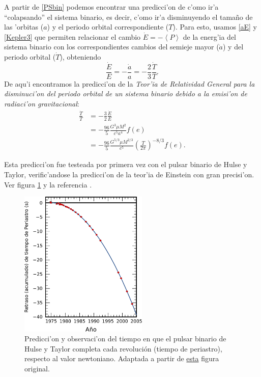 A partir de \eqref{PSbin} podemos encontrar una predicci'on de c'omo ir'a ``colapsando'' el sistema binario, es decir, c'omo ir'a disminuyendo el tama\~no de las 'orbitas ($a$) y el periodo orbital correspondiente ($T$). Para esto, usamos \eqref{aE} y \eqref{Kepler3} que permiten relacionar el cambio $\dot{E}=-\left\langle P\right\rangle$ de la energ'ia del sistema binario con los correspondientes cambios del semieje mayor ($\dot{a}$) y del periodo orbital ($\dot{T}$), obteniendo
\begin{equation}
\frac{\dot{E}}{E}=-\frac{\dot{a}}{a}=-\frac{2}{3}\frac{\dot{T}}{T}.
\end{equation}
De aqu'i encontramos la predicci'on de la \textit{Teor'ia de Relatividad General para la disminuci'on del periodo orbital de un sistema binario debido a la emisi'on de radiaci'on gravitacional}:
\begin{align}
\frac{\dot{T}}{T} &= -\frac{3}{2}\frac{\dot{E}}{E} \\
&= -\frac{96}{5} \frac{G^3\mu M^2}{c^5a^4}f(e) \\
&= -\frac{96}{5} \frac{G^{5/3}\mu M^{2/3}}{c^5}\left(\frac{T}{2\pi}\right)^{-8/3}f(e).
\end{align}

Esta predicci'on fue testeada por primera vez con el pulsar binario de Hulse y Taylor, verific'andose la predicci'on de la teor'ia de Einstein con gran precisi'on. Ver figura \ref{fig:HT} y la referencia \cite{WT05}.
\begin{center}
\begin{figure}[H]
\centerline{\includegraphics[height=7cm]{fig/fig-HT.pdf}}
\caption{Predicci'on y observaci'on del tiempo en que el pulsar binario de Hulse y Taylor completa cada revolución (tiempo de periastro), respecto al valor newtoniano. Adaptada a partir de \href{http://en.wikipedia.org/wiki/File:PSR_B1913\%2B16_period_shift_graph.svg}{esta} figura original.}
\label{fig:HT}
\end{figure}
\end{center}


